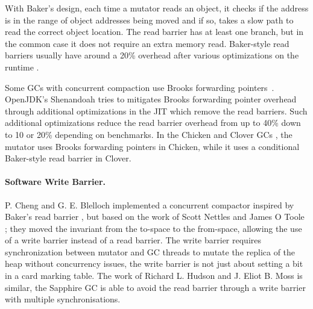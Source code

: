 \documentclass[sigplan,10pt,review,anonymous]{acmart}\settopmatter{printfolios=true,printccs=false,printacmref=false}
\begin{document}
With Baker's design, each time a mutator reads an object, it checks if the address is in the range of object addresses being moved and if so, takes a slow path to read the correct object location. The read barrier has at least one branch, but in the common case it does not require an extra memory read. Baker-style read barriers usually have around a 20\% overhead after various optimizations on the runtime \cite{BarrierMethods}.

Some GCs with concurrent compaction use Brooks forwarding pointers~\cite{MetronomeIBMGC,RTGCBrooksReadBarrier,Shenandoah}.
OpenJDK's Shenandoah \cite{Shenandoah} tries to mitigates Brooks forwarding pointer overhead through additional optimizations in the JIT which remove the read barriers. Such additional optimizations reduce the read barrier overhead from up to 40\% down to 10 or 20\% depending on benchmarks. In the Chicken and Clover GCs \cite{RTConcCompactGC}, the mutator uses Brooks forwarding pointers in Chicken, while it uses a conditional Baker-style read barrier in Clover.

\paragraph{Software Write Barrier.}
P. Cheng and G. E. Blelloch \cite{WBConcCompactNew} implemented a concurrent compactor inspired by Baker's read barrier \cite{BakerReadBarrier}, but based on the work of Scott Nettles and James O Toole \cite{WBConcCompactOld}; they moved the invariant from the to-space to the from-space, allowing the use of a write barrier instead of a read barrier. 
The write barrier requires synchronization between mutator and GC threads to mutate the replica of the heap without concurrency issues, the write barrier is not just about setting a bit in a card marking table. The work of Richard L. Hudson and J. Eliot B. Moss \cite{SapphireConcCompactNoRB} is similar, the Sapphire GC is able to avoid the read barrier through a write barrier with multiple synchronisations.
\end{document}
